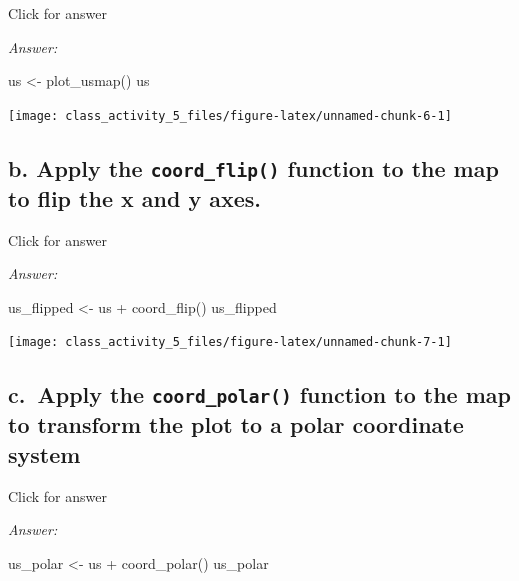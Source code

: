 \documentclass[
]{book}
\newenvironment{Shaded}{\begin{snugshade}}{\end{snugshade}}
\newcommand{\FunctionTok}[1]{\textcolor[rgb]{0.00,0.00,0.00}{#1}}
\newcommand{\NormalTok}[1]{#1}
\newcommand{\OtherTok}[1]{\textcolor[rgb]{0.56,0.35,0.01}{#1}}
\newcommand{\SpecialCharTok}[1]{\textcolor[rgb]{0.00,0.00,0.00}{#1}}
\begin{document}
Click for answer

\emph{Answer:}

\begin{Shaded}
\begin{Highlighting}[]
\NormalTok{us }\OtherTok{\textless{}{-}} \FunctionTok{plot\_usmap}\NormalTok{()}
\NormalTok{us}
\end{Highlighting}
\end{Shaded}

\texttt{[image: class\_activity\_5\_files/figure-latex/unnamed-chunk-6-1]}

\hypertarget{b.-apply-the-coord_flip-function-to-the-map-to-flip-the-x-and-y-axes.}{%
\subsection{\texorpdfstring{b. Apply the \texttt{coord\_flip()} function to the map to flip the x and y axes.}{b. Apply the coord\_flip() function to the map to flip the x and y axes.}}\label{b.-apply-the-coord_flip-function-to-the-map-to-flip-the-x-and-y-axes.}}

Click for answer

\emph{Answer:}

\begin{Shaded}
\begin{Highlighting}[]
\NormalTok{us\_flipped }\OtherTok{\textless{}{-}}\NormalTok{ us }\SpecialCharTok{+} \FunctionTok{coord\_flip}\NormalTok{()}
\NormalTok{us\_flipped}
\end{Highlighting}
\end{Shaded}

\texttt{[image: class\_activity\_5\_files/figure-latex/unnamed-chunk-7-1]}

\hypertarget{c.-apply-the-coord_polar-function-to-the-map-to-transform-the-plot-to-a-polar-coordinate-system}{%
\subsection{\texorpdfstring{c.~Apply the \texttt{coord\_polar()} function to the map to transform the plot to a polar coordinate system}{c.~Apply the coord\_polar() function to the map to transform the plot to a polar coordinate system}}\label{c.-apply-the-coord_polar-function-to-the-map-to-transform-the-plot-to-a-polar-coordinate-system}}

Click for answer

\emph{Answer:}

\begin{Shaded}
\begin{Highlighting}[]
\NormalTok{us\_polar }\OtherTok{\textless{}{-}}\NormalTok{ us }\SpecialCharTok{+} \FunctionTok{coord\_polar}\NormalTok{()}
\NormalTok{us\_polar}
\end{Highlighting}
\end{Shaded}
\end{document}
